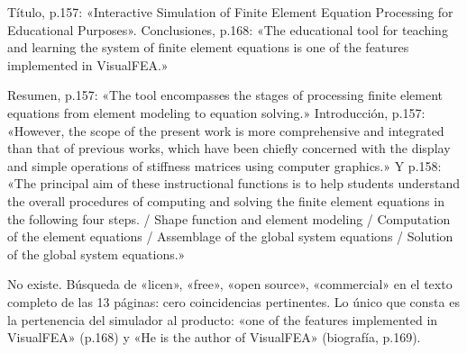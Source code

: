 \documentclass[11pt,a4paper]{article}
\newcommand{\campo}[1]{\textcolor{gris}{\footnotesize #1}}
\begin{document}
\begin{pasaje}\footnotesize Título, p.157: «Interactive Simulation of Finite Element Equation Processing for Educational Purposes». Conclusiones, p.168: «The educational tool for teaching and learning the system of finite element equations is one of the features implemented in VisualFEA.»\end{pasaje}
\vspace{3pt}\noindent{\small\textbf{p.\ 157 y 158} \quad \campo{«La segunda familia la integran los simuladores que profundizan en un eslabón aislado del método» --- tesis/capitulos/02\_marco\_teorico.tex:11 --- y la fila de la tabla comparativa «Simuladores interactivos ... Parcial (un eslabón)» --- 02\_marco\_teorico.tex:30}}\par
\begin{pasaje}\footnotesize Resumen, p.157: «The tool encompasses the stages of processing finite element equations from element modeling to equation solving.» Introducción, p.157: «However, the scope of the present work is more comprehensive and integrated than that of previous works, which have been chiefly concerned with the display and simple operations of stiffness matrices using computer graphics.» Y p.158: «The principal aim of these instructional functions is to help students understand the overall procedures of computing and solving the finite element equations in the following four steps. / Shape function and element modeling / Computation of the element equations / Assemblage of the global system equations / Solution of the global system equations.»\end{pasaje}
\vspace{3pt}\noindent{\small\textbf{p.\ AUSENTE} \quad \campo{Fila de la tabla comparativa: régimen de licencia «Libre» para los simuladores interactivos de Lee --- tesis/capitulos/02\_marco\_teorico.tex:30}}\par
\begin{pasaje}\footnotesize No existe. Búsqueda de «licen», «free», «open source», «commercial» en el texto completo de las 13 páginas: cero coincidencias pertinentes. Lo único que consta es la pertenencia del simulador al producto: «one of the features implemented in VisualFEA» (p.168) y «He is the author of VisualFEA» (biografía, p.169).\end{pasaje}
\vspace{3pt}\noindent{\small\textbf{p.\ 168} \quad \campo{«El software educativo interactivo demuestra eficacia para consolidar conceptos abstractos del análisis estructural» --- tesis/capitulos/03\_diseno\_implementacion.tex:9}}\par
\end{document}
